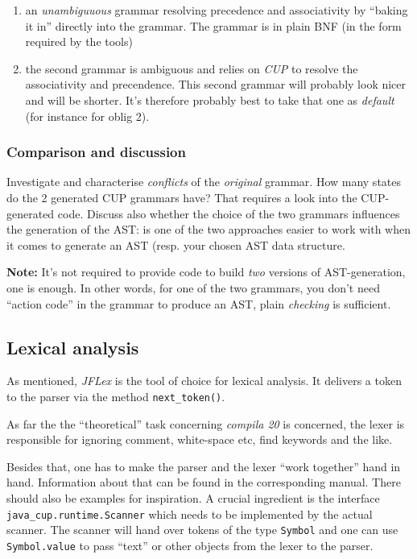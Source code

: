 \documentclass[10pt,freeform]{handout}[2014/08/13]
\begin{document}
\begin{enumerate}
\item an \emph{unambiguuous} grammar resolving precedence and associativity
  by ``baking it in'' directly into the grammar. The grammar is in plain
  BNF (in the form required by the tools)
\item the second grammar is ambiguous and relies on \emph{CUP} to resolve
  the associativity and precendence. This second grammar will probably look
  nicer and will be shorter. It's therefore probably best to take that one
  as \emph{default} (for instance for oblig 2).
\end{enumerate}

\subsubsection*{Comparison and discussion}
\label{sec:comparison}

Investigate and characterise \emph{conflicts} of the \emph{original}
grammar. How many states do the 2 generated CUP grammars have? That
requires a look into the CUP-generated code. Discuss also whether the
choice of the two grammars influences the generation of the AST: is one of
the two approaches easier to work with when it comes to generate an AST
(resp. your chosen AST data structure.


\textbf{Note:} It's not required to provide code to build \emph{two}
versions of AST-generation, one is enough. In other words, for one of the
two grammars, you don't need ``action code'' in the grammar to produce an
AST, plain \emph{checking} is sufficient.

\subsection{Lexical analysis}
\label{sec:lexical-analysis}

As mentioned, \textsl{JFLex} is the tool of choice for lexical analysis. It
delivers a token to the parser via the method \texttt{next\_token()}.  

As far the the ``theoretical'' task concerning \textsl{compila 20} is
concerned, the lexer is responsible for ignoring comment, white-space etc,
find keywords and the like.

Besides that, one has to make the parser and the lexer ``work together''
hand in hand. Information about that can be found in the corresponding
manual. There should also be examples for inspiration. A crucial ingredient
is the interface \texttt{java\_cup.runtime.Scanner} which needs to be
implemented by the actual scanner. The scanner will hand over tokens of the
type \texttt{Symbol} and one can use \texttt{Symbol.value} to pass ``text''
or other objects from the lexer to the parser.
\end{document}
